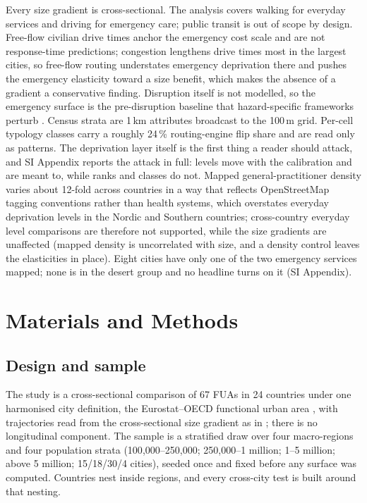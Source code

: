 \documentclass[9pt,twocolumn]{article}
\begin{document}
Every size gradient is cross-sectional. The analysis covers walking for
everyday services and driving for emergency care; public transit is out
of scope by design. Free-flow civilian drive times anchor the emergency
cost scale and are not response-time predictions; congestion lengthens
drive times most in the largest cities, so free-flow routing understates
emergency deprivation there and pushes the emergency elasticity toward a
size benefit, which makes the absence of a gradient a conservative
finding. Disruption itself is not modelled, so the emergency surface is
the pre-disruption baseline that hazard-specific frameworks perturb
\citep{pagancajigas2026acces}. Census strata are 1\,km attributes
broadcast to the 100\,m grid. Per-cell typology classes carry a roughly
24\,\% routing-engine flip share and are read only as patterns. The
deprivation layer itself is the first thing a reader should attack, and
SI Appendix reports the attack in full: levels move with the calibration
and are meant to, while ranks and classes do not. Mapped
general-practitioner density varies about 12-fold across countries in a
way that reflects OpenStreetMap tagging conventions rather than health
systems, which overstates everyday deprivation levels in the Nordic and
Southern countries; cross-country everyday level comparisons are therefore
not supported, while the size gradients are unaffected (mapped density is
uncorrelated with size, and a density control leaves the elasticities in
place). Eight cities have only one of the two emergency services mapped;
none is in the desert group and no headline turns on it (SI Appendix).

\section*{Materials and Methods}

\subsection*{Design and sample}
The study is a cross-sectional comparison of 67 FUAs in 24 countries under
one harmonised city definition, the Eurostat--OECD functional urban area
\citep{dijkstra2019fua}, with trajectories read from the cross-sectional
size gradient as in \citep{musso2026cities}; there is no longitudinal
component. The sample is a stratified draw over four macro-regions and
four population strata (100{,}000--250{,}000; 250{,}000--1 million; 1--5
million; above 5 million; 15/18/30/4 cities), seeded once and fixed
before any surface was computed. Countries nest inside regions, and every
cross-city test is built around that nesting.
\end{document}
